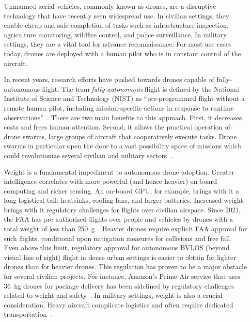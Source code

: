 Unmanned aerial vehicles, commonly known as drones, are a disruptive technology that have recently seen widespread use. In civilian settings, they enable cheap and safe completion of tasks such as infrastructure inspection, agriculture monitoring, wildfire control, and police surveillance. In military settings, they are a vital tool for advance reconnaissance. For most use cases today, drones are deployed with a human pilot who is in constant control of the aircraft.

In recent years, research efforts have pushed towards drones capable of fully-autonomous flight. The term \textit{fully-autonomous} flight is defined by the National Institute of Science and Technology (NIST) as “pre-programmed flight without a remote human pilot, including mission-specific actions in response to runtime observations”~\cite{Huang2008}. There are two main benefits to this approach. First, it decreases costs and frees human attention. Second, it allows the practical operation of drone swarms, large groups of aircraft that cooperatively execute tasks. Drone swarms in particular open the door to a vast possibility space of missions which could revolutionize several civilian and military sectors~\cite{Burkle2009}.

Weight is a fundamental impediment to autonomous drone adoption. Greater intelligence correlates with more powerful (and hence heavier) on-board computing and richer sensing. An on-board GPU, for example, brings with it a long logistical tail: heatsinks, cooling fans, and larger batteries. Increased weight brings with it regulatory challenges for flights over civilian airspace. Since 2021, the FAA has pre-authorized flights over people and vehicles by drones with a total weight of less than 250~g~\cite{FAA2021}. Heavier drones require explicit FAA approval for such flights, conditional upon mitigation measures for collisions and free fall. Even above this limit, regulatory approval for autonomous BVLOS (beyond visual line of sight) flight in dense urban settings is easier to obtain for lighter drones than for heavier drones. This regulation has proven to be a major obstacle for several civilian projects. For instance, Amazon’s Prime Air service that uses 36~kg drones for package delivery has been sidelined by regulatory challenges related to weight and safety~\cite{Link2023}. In military settings, weight is also a crucial consideration. Heavy aircraft complicate logistics and often require dedicated transportation~\cite{DefensePost}. 

